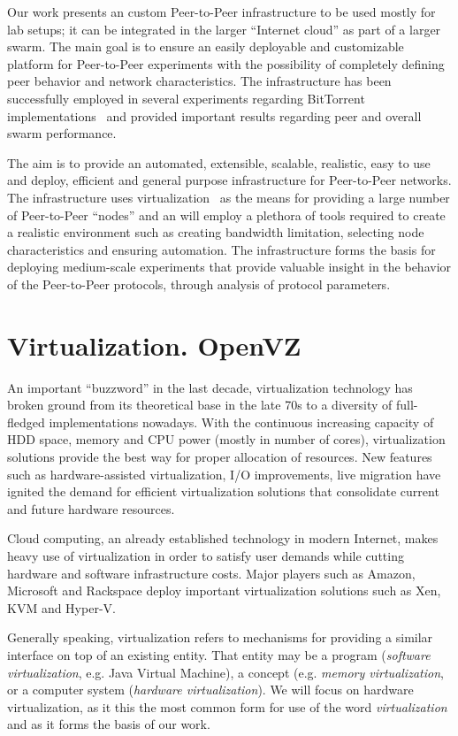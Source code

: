 Our work presents an custom Peer-to-Peer infrastructure to be used mostly for
lab setups; it can be integrated in the larger ``Internet cloud'' as part of a
larger swarm. The main goal is to ensure an easily deployable and customizable
platform for Peer-to-Peer experiments with the possibility of completely
defining peer behavior and network characteristics. The infrastructure has
been successfully employed in several experiments regarding BitTorrent
implementations~\cite{bt-pef} and provided important results regarding peer and overall
swarm performance.

The aim is to provide an automated, extensible, scalable, realistic, easy to
use and deploy, efficient and general purpose infrastructure for Peer-to-Peer
networks. The infrastructure uses virtualization~\cite{p2p-va} as the means for
providing a large number of Peer-to-Peer ``nodes'' and an will employ a
plethora of tools required to create a realistic environment such as creating
bandwidth limitation, selecting node characteristics and ensuring automation.
The infrastructure forms the basis for deploying medium-scale experiments that
provide valuable insight in the behavior of the Peer-to-Peer protocols,
through analysis of protocol parameters.

\section{Virtualization. OpenVZ}
\label{sec:virt-infra:openvz}

An important ``buzzword'' in the last decade, virtualization technology has
broken ground from its theoretical base in the late 70s to a diversity of
full-fledged implementations nowadays. With the continuous increasing capacity
of HDD space, memory and CPU power (mostly in number of cores), virtualization
solutions provide the best way for proper allocation of resources. New
features such as hardware-assisted virtualization, I/O improvements, live
migration have ignited the demand for efficient virtualization solutions that
consolidate current and future hardware resources.

Cloud computing, an already established technology in modern Internet, makes
heavy use of virtualization in order to satisfy user demands while cutting
hardware and software infrastructure costs. Major players such as Amazon,
Microsoft and Rackspace deploy important virtualization solutions such as Xen,
KVM and Hyper-V.

Generally speaking, virtualization refers to mechanisms for providing a
similar interface on top of an existing entity. That entity may be a program
(\textit{software virtualization}, e.g. {Java Virtual Machine}),
a concept (e.g. \textit{memory virtualization}, or a computer system
(\textit{hardware virtualization}). We will focus on hardware virtualization,
as it this the most common form for use of the word \textit{virtualization}
and as it forms the basis of our work.


